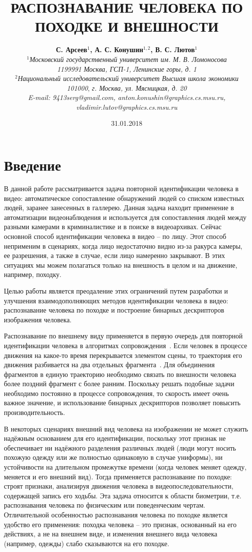 \documentclass[a4paper,twoside,11pt]{article}
\author{
{\bfseries С. Арсеев$^1$, А. С. Конушин$^{1,2}$, В. С. Лютов$^1$}
\\ {\itshape $^1$Московский государственный университет им. М. В. Ломоносова}
\\ {\slshape 1199991} {\itshape Москва, ГСП-1, Ленинские горы, д.} {\slshape 1}
\\ {\itshape $^2$Национальный исследовательский университет Высшая школа экономики}
\\ {\slshape 101000}, {\itshape г. Москва, ул. Мясницкая, д.} {\slshape 20}
\\ {\itshape E-mail: 9413serg@gmail.com, anton.konushin@graphics.cs.msu.ru, vladimir.lutov@graphics.cs.msu.ru }}
\title{РАСПОЗНАВАНИЕ ЧЕЛОВЕКА ПО ПОХОДКЕ И ВНЕШНОСТИ}
\date{31.01.2018}
\numberwithin{equation}{section}
\begin{document}
\maketitle
\setcounter{page}{3}


\section{Введение}

В данной работе рассматривается задача повторной идентификации человека в видео: автоматическое сопоставление обнаружений людей со списком известных людей, заранее занесенных в галлерею. Данная задача находит применение в автоматизации видеонаблюдения и используется для сопоставления людей между разными камерами в криминалистике и в поиске в видеоархивах. Сейчас основной способ идентификации человека в видео -- по лицу. Этот способ неприменим в сценариях, когда лицо недостаточно видно из-за ракурса камеры, ее разрешения, а также в случае, если лицо намеренно закрывают. В этих ситуациях мы можем полагаться только на внешность в целом и на движение, например, походку.

Целью работы является преодаление этих ограничений путем разработки и улучшения взаимодополняющих методов идентификации человека в видео: распознавание человека по походке и построение бинарных дескрипторов изображения человека.

Распознавание по внешнему виду применяется в первую очередь для повторной идентификации человека в алгоритмах сопровождения~\cite{kuplyakov2017markov}. Если человек в процессе движения на какое-то время перекрывается элементом сцены, то траектория его движения разбивается на два отдельных фрагмента~\cite{shal2016estimation}. Для объединения фрагментов в единую траекторию необходимо связать по внешности человека более поздний фрагмент с более ранним. Поскольку решать подобные задачи необходимо постоянно в процессе сопровождения, то скорость имеет очень важное значение, и использование бинарных дескрипторов позволяет повысить производительность.  

В некоторых сценариях внешний вид человека на изображении не может служить надёжным основанием для его идентификации, поскольку этот признак не обеспечивает ни надёжного разделения различных людей (люди могут носить похожую одежду или же полностью одинаковую в случае униформы), ни устойчивости на длительном промежутке времени (когда человек меняет одежду, меняется и его внешний вид). Тогда применяется распознавание по походке: строят признаки, анализируя движения человека в видеопоследовательности, содержащей запись его ходьбы. Эта задача относится к области биометрии, т.е. распознавания человека по физическим или поведенческим чертам. Отличительной особенностью распознавания человека по походке является удобство его применения: походка человека – это признак, основанный на его действиях, а не на внешнем виде, и изменения внешнего вида человека  (например, одежды) слабо сказываются на его походке.
\end{document}
